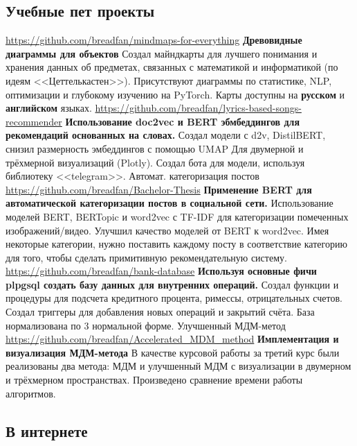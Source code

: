 \documentclass[11pt,a4paper]{moderncv}
\begin{document}
	\subsection{Учебные пет проекты}
	{\url{https://github.com/breadfan/mindmaps-for-everything}\newline{}
		\textbf{Древовидные диаграммы для объектов}\newline{}
		Создал майндкарты для лучшего понимания и хранения данных об предметах, связанных с математикой и информатикой (по идеям <<Цеттелькастен>>). 
		Присутствуют диаграммы по статистике, NLP, оптимизации и глубокому изучению на PyTorch. Карты доступны на \textbf{русском} и \textbf{английском} языках.  
	}
	{\url{https://github.com/breadfan/lyrics-based-songs-recommender}\newline{}
		\textbf{Использование doc2vec и BERT эбмбеддингов для рекомендаций основанных на словах.}\newline{}
		Создал модели с d2v, DistilBERT, снизил размерность эмбеддингов с помощью UMAP Для двумерной и трёхмерной визуализаций (Plotly). Создал бота для модели, используя библиотеку <<telegram>>.
	}
	\cvline
	{Автомат. категоризация постов}
	{\url{https://github.com/breadfan/Bachelor-Thesis}\newline{}
		\textbf{Применение BERT для автоматической категоризации постов в социальной сети.} \newline{}
		Использование моделей BERT, BERTopic и word2vec с TF-IDF для категоризации помеченных изображений/видео.\newline{}
		Улучшил качество моделей от BERT к word2vec.\newline{}
		Имея некоторые категории, нужно поставить каждому посту в соответствие категорию для того, чтобы сделать примитивную рекомендательную систему.
	}
	{\url{https://github.com/breadfan/bank-database}\newline{}
		\textbf{Используя основные фичи plpgsql создать базу данных для внутренних операций.}\newline{}
		Создал функции и процедуры для подсчета кредитного процента, римессы, отрицательных счетов.
		Создал триггеры для добавления новых операций и закрытий счёта. База нормализована по 3 нормальной форме.	  
	}
	\cvline
	{Улучшенный МДМ-метод}
	{\url{https://github.com/breadfan/Accelerated_MDM_method}\newline{}
		\textbf{Имплементация и визуализация МДМ-метода}\newline{}
		В качестве курсовой работы за третий курс были реализованы два метода: МДМ и улучшенный МДМ с визуализации в двумерном и трёхмерном пространствах. Произведено сравнение времени работы алгоритмов.
	}
	
	
	\subsection{В интернете}
	
\end{document}
